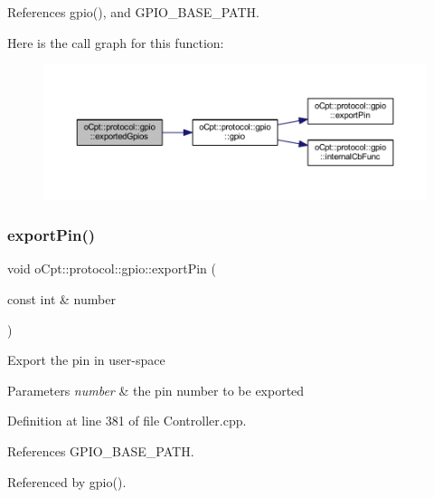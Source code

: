 References gpio(), and G\+P\+I\+O\+\_\+\+B\+A\+S\+E\+\_\+\+P\+A\+TH.

Here is the call graph for this function\+:\nopagebreak
\begin{figure}[H]
\begin{center}
\leavevmode
\includegraphics[width=350pt]{classo_cpt_1_1protocol_1_1gpio_a2beacd45b177eb627e66a3b252a4aaff_cgraph}
\end{center}
\end{figure}
\hypertarget{classo_cpt_1_1protocol_1_1gpio_af7fef4210406ea75eb04cc96fd99e7eb}{}\label{classo_cpt_1_1protocol_1_1gpio_af7fef4210406ea75eb04cc96fd99e7eb} 
\subsubsection{\texorpdfstring{export\+Pin()}{exportPin()}}
{\footnotesize\ttfamily void o\+Cpt\+::protocol\+::gpio\+::export\+Pin (\begin{DoxyParamCaption}\item[{const int \&}]{number }\end{DoxyParamCaption})\hspace{0.3cm}{\ttfamily [private]}}

Export the pin in user-\/space 
\begin{DoxyParams}{Parameters}
{\em number} & the pin number to be exported \\
\hline
\end{DoxyParams}


Definition at line 381 of file Controller.\+cpp.



References G\+P\+I\+O\+\_\+\+B\+A\+S\+E\+\_\+\+P\+A\+TH.



Referenced by gpio().

